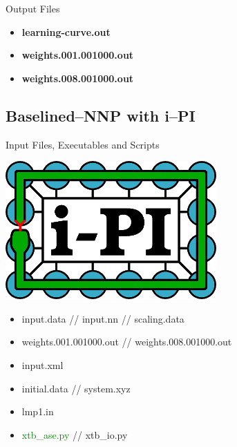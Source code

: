 \documentclass[12pt]{article}
\begin{document}
\begin{mybox3}{Output Files}
\begin{itemize}
    \item \textbf{learning-curve.out}
    \item \textbf{weights.001.001000.out}
    \item \textbf{weights.008.001000.out}
\end{itemize}
\end{mybox3}
%
\subsection{Baselined--NNP with i--PI}
\begin{mybox2}{{Input Files, Executables and Scripts}}
\begin{minipage}[c]{0.5\linewidth}
\includegraphics[scale=0.35]{ipi-logo-alpha.png}
\end{minipage}
\begin{minipage}[c]{0.5\linewidth}
\begin{itemize}
    \item input.data // input.nn // scaling.data
    \item weights.001.001000.out // weights.008.001000.out
    \item input.xml
    \item initial.data // system.xyz
    \item lmp1.in
    \item \textcolor{green}{xtb\_ase.py} // xtb\_io.py
\end{itemize}
\end{minipage}
\end{mybox2}
\end{document}
